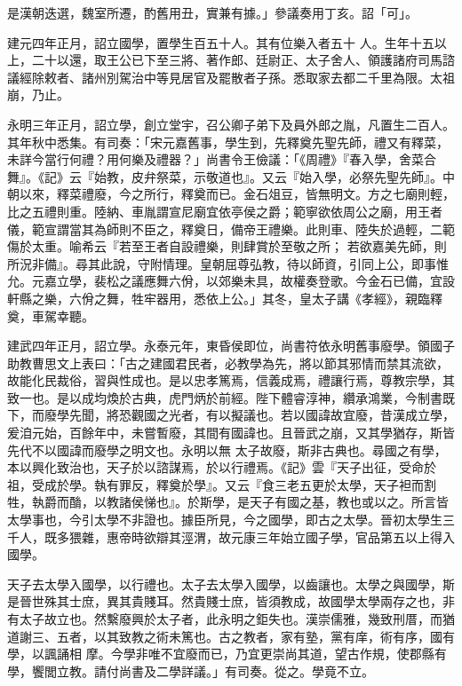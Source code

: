\begin{pinyinscope}
 是漢朝迭選，魏室所遷，酌舊用丑，實兼有據。」參議奏用丁亥。詔「可」。



 建元四年正月，詔立國學，置學生百五十人。其有位樂入者五十
 人。生年十五以上，二十以還，取王公已下至三將、著作郎、廷尉正、太子舍人、領護諸府司馬諮議經除敕者、諸州別駕治中等見居官及罷散者子孫。悉取家去都二千里為限。太祖崩，乃止。



 永明三年正月，詔立學，創立堂宇，召公卿子弟下及員外郎之胤，凡置生二百人。其年秋中悉集。有司奏：「宋元嘉舊事，學生到，先釋奠先聖先師，禮又有釋菜，未詳今當行何禮？用何樂及禮器？」尚書令王儉議：「《周禮》『春入學，舍菜合舞』。《記》云『始教，皮弁祭菜，示敬道也』。又云『始入學，必祭先聖先師』。中朝以來，釋菜禮廢，今之所行，釋奠而已。金石俎豆，皆無明文。方之七廟則輕，比之五禮則重。陸納、車胤謂宣尼廟宜依亭侯之爵；範寧欲依周公之廟，用王者儀，範宣謂當其為師則不臣之，釋奠日，備帝王禮樂。此則車、陸失於過輕，二範傷於太重。喻希云『若至王者自設禮樂，則肆賞於至敬之所；
 若欲嘉美先師，則所況非備』。尋其此說，守附情理。皇朝屈尊弘教，待以師資，引同上公，即事惟允。元嘉立學，裴松之議應舞六佾，以郊樂未具，故權奏登歌。今金石已備，宜設軒縣之樂，六佾之舞，牲牢器用，悉依上公。」其冬，皇太子講《孝經》，親臨釋奠，車駕幸聽。



 建武四年正月，詔立學。永泰元年，東昏侯即位，尚書符依永明舊事廢學。領國子助教曹思文上表曰：「古之建國君民者，必教學為先，將以節其邪情而禁其流欲，故能化民裁俗，習與性成也。是以忠孝篤焉，信義成焉，禮讓行焉，尊教宗學，其致一也。是以成均煥於古典，虎門炳於前經。陛下體睿淳神，纘承鴻業，今制書既下，而廢學先聞，將恐觀國之光者，有以擬議也。若以國諱故宜廢，昔漢成立學，爰洎元始，百餘年中，未嘗暫廢，其間有國諱也。且晉武之崩，又其學猶存，斯皆先代不以國諱而廢學之明文也。永明以無
 太子故廢，斯非古典也。尋國之有學，本以興化致治也，天子於以諮謀焉，於以行禮焉。《記》雲『天子出征，受命於祖，受成於學。執有罪反，釋奠於學』。又云『食三老五更於太學，天子袒而割牲，執爵而酳，以教諸侯悌也』。於斯學，是天子有國之基，教也或以之。所言皆太學事也，今引太學不非證也。據臣所見，今之國學，即古之太學。晉初太學生三千人，既多猥雜，惠帝時欲辯其涇渭，故元康三年始立國子學，官品第五以上得入國學。



 天子去太學入國學，以行禮也。太子去太學入國學，以齒讓也。太學之與國學，斯是晉世殊其士庶，異其貴賤耳。然貴賤士庶，皆須教成，故國學太學兩存之也，非有太子故立也。然繫廢興於太子者，此永明之鉅失也。漢崇儒雅，幾致刑厝，而猶道謝三、五者，以其致教之術未篤也。古之教者，家有塾，黨有庠，術有序，國有學，以諷誦相
 摩。今學非唯不宜廢而已，乃宜更崇尚其道，望古作規，使郡縣有學，饗閭立教。請付尚書及二學詳議。」有司奏。從之。學竟不立。




\end{pinyinscope}
